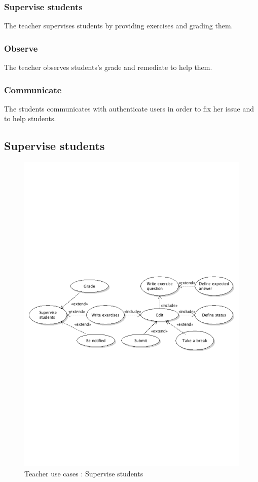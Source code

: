 		\subsubsection{Supervise students}
			The teacher supervises students by providing exercises and grading them.
		\subsubsection{Observe}
			The teacher observes students's grade and remediate to help them.
		\subsubsection{Communicate}
			The students communicates with authenticate users in order to fix her issue and to help students.
\newpage
	\subsection{Supervise students}
		\begin{figure}[ht]
			\begin{center}
				\includegraphics[width=\textwidth,  trim=2cm 10cm 2cm 10cm]{UML_figure/UC/teacher/UC_Teacher_Supervise.pdf}
				\caption{Teacher use cases : Supervise students}
			\end{center}
		\end{figure}
